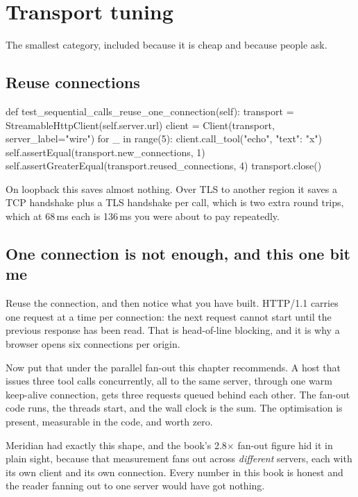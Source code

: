 \section{Transport tuning}

The smallest category, included because it is cheap and because people ask.

\subsection{Reuse connections}

\begin{py}
def test_sequential_calls_reuse_one_connection(self):
    transport = StreamableHttpClient(self.server.url)
    client = Client(transport, server_label="wire")
    for _ in range(5):
        client.call_tool("echo", {"text": "x"})
    self.assertEqual(transport.new_connections, 1)
    self.assertGreaterEqual(transport.reused_connections, 4)
    transport.close()
\end{py}

On loopback this saves almost nothing. Over TLS to another region it saves a TCP
handshake plus a TLS handshake per call, which is two extra round trips, which at
68\,ms each is 136\,ms you were about to pay repeatedly.

\subsection{One connection is not enough, and this one bit me}

Reuse the connection, and then notice what you have built. HTTP/1.1 carries one
request at a time per connection: the next request cannot start until the
previous response has been read. That is head-of-line blocking, and it is why a
browser opens six connections per origin.

Now put that under the parallel fan-out this chapter recommends. A host that
issues three tool calls concurrently, all to the same server, through one warm
keep-alive connection, gets three requests queued behind each other. The fan-out
code runs, the threads start, and the wall clock is the sum. The optimisation is
present, measurable in the code, and worth zero.

Meridian had exactly this shape, and the book's 2.8$\times$ fan-out figure hid it
in plain sight, because that measurement fans out across \emph{different}
servers, each with its own client and its own connection. Every number in this
book is honest and the reader fanning out to one server would have got nothing.

